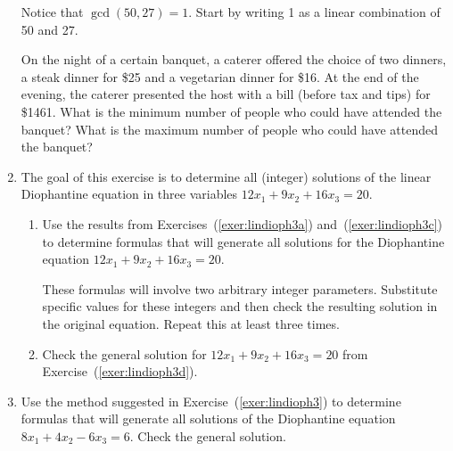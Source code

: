\begin{enumerate}
\noindent
\hint  Notice that $\gcd( {50, 27} ) = 1$.  Start by writing 1 as a linear combination of 50 and 27.

\xitem On the night of a certain banquet, a caterer offered the choice of two dinners, a steak dinner for \$25 and a vegetarian dinner for \$16.  At the end of the evening, the caterer presented the host with a bill (before tax and tips) for \$1461.  What is the minimum number of people who could have attended the banquet?  What is the maximum number of people who could have attended the banquet? \label{exer:sec83-5}

\item The goal of this exercise is to determine all (integer) solutions of the linear Diophantine equation in three variables $12x_1 + 9x_2 + 16x_3 = 20$.  \label{exer:lindioph3}
\begin{enumerate}
\yitem First, notice that $\gcd( {12, 9} ) = 3$.  Determine formulas that will generate all solutions for the linear Diophantine equation \linebreak
$3y + 16x_3 = 20$. \label{exer:lindioph3a}

\yitem Explain why the solutions (for $x_1$ and $x_2$) of the Diophantine equation 
$12x_1 + 9x_2 = 3y$ can be used to generate solutions for 
\linebreak
$12x_1 + 9x_2 + 16x_3 = 20$.

\yitem Use the general value for $y$ from Exercise~(\ref{exer:lindioph3a}) to determine the solutions of $12x_1 + 9x_2 = 3y$.
\label{exer:lindioph3c}

\item Use the results from Exercises~(\ref{exer:lindioph3a})  and~(\ref{exer:lindioph3c})  to determine formulas that will generate all solutions for the Diophantine equation 
\linebreak
$12x_1 + 9x_2 + 16x_3 = 20$.
\label{exer:lindioph3d}

\note  These formulas will involve two arbitrary integer parameters.  Substitute specific values for these integers and then check the resulting solution in the original equation.  Repeat this at least three times.

\item Check the general solution for $12x_1 + 9x_2 + 16x_3 = 20$ from Exercise~(\ref{exer:lindioph3d}).

\end{enumerate}

\item Use the method suggested in Exercise~(\ref{exer:lindioph3}) to determine formulas that will generate all solutions of the Diophantine equation  
$8x_1 +4x_2 - 6x_3 = 6$.  Check the general solution.


\end{enumerate}
